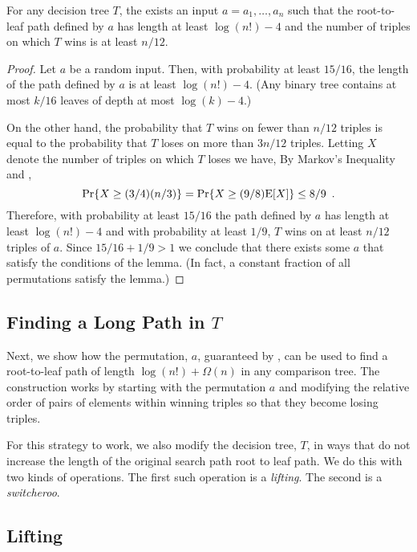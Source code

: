 \documentclass{patmorin}
\begin{document}
\begin{lem}
  For any decision tree $T$, the exists an input $a=a_1,\ldots,a_n$
  such that the root-to-leaf path defined by $a$ has length at least
  $\log(n!)-4$ and the number of triples on which $T$ wins is at least
  $n/12$.
\end{lem}

\begin{proof}
Let $a$ be a random input.  Then, with probability at least $15/16$, the
length of the path defined by $a$ is at least $\log(n!)-4$.  (Any binary
tree contains at most $k/16$ leaves of depth at most $\log(k)-4$.)

On the other hand, the probability that $T$ wins on fewer than $n/12$
triples is equal to the probability that $T$ loses on more than $3n/12$
triples.  Letting $X$ denote the number of triples on which $T$ loses
we have, By Markov's Inequality and ,
\[
   \Pr\{X\ge (3/4)(n/3)\} = \Pr\{X \ge (9/8)\mathrm{E}[X]\} \le 8/9 \enspace . 
\]
Therefore, with probability at least $15/16$ the path defined by $a$
has length at least $\log(n!)-4$ and with probability at least $1/9$, $T$
wins on at least $n/12$ triples of $a$.  Since $15/16+1/9 > 1$ we conclude
that there exists some $a$ that satisfy the conditions of the lemma. (In
fact, a constant fraction of all permutations satisfy the lemma.)
\end{proof}

\subsection{Finding a Long Path in $T$}

Next, we show how the permutation, $a$, guaranteed by
, can be used to find a root-to-leaf path of length
$\log(n!)+\Omega(n)$ in any comparison tree.  The construction works
by starting with the permutation $a$ and modifying the relative order
of pairs of elements within winning triples so that they become losing
triples.

For this strategy to work, we also modify the decision tree, $T$, in
ways that do not increase the length of the original search path root
to leaf path.  We do this with two kinds of operations.  The first such
operation is a \emph{lifting}.  The second is a \emph{switcheroo}.

\subsection{Lifting}
\end{document}
